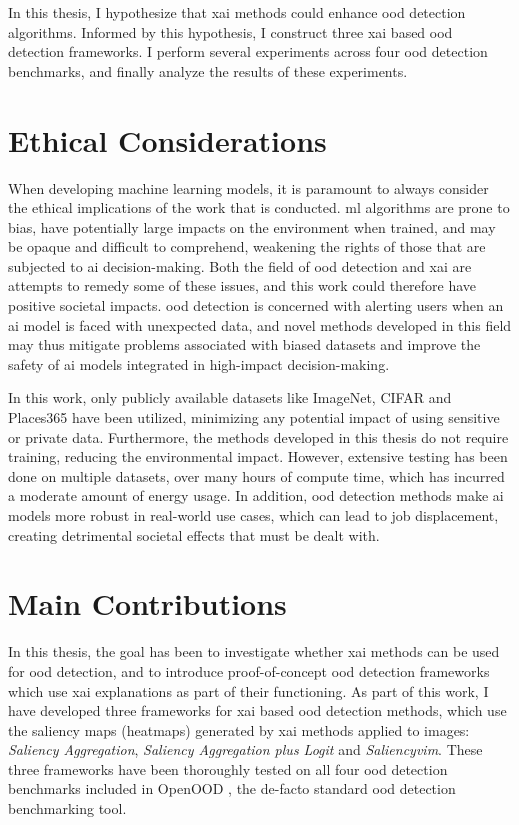 \documentclass[UKenglish]{uiomasterthesis} %
\theoremstyle{definition}
\begin{document}
In this thesis, I hypothesize that \ac{xai} methods could enhance \ac{ood} detection algorithms. Informed by this hypothesis, I construct three \ac{xai} based \ac{ood} detection frameworks. I perform several experiments across four \ac{ood} detection benchmarks, and finally analyze the results of these experiments.

\section{Ethical Considerations}

When developing machine learning models, it is paramount to always consider the ethical implications of the work that is conducted. \ac{ml} algorithms are prone to bias, have potentially large impacts on the environment when trained, and may be opaque and difficult to comprehend, weakening the rights of those that are subjected to \ac{ai} decision-making. Both the field of \ac{ood} detection and \ac{xai} are attempts to remedy some of these issues, and this work could therefore have positive societal impacts. \ac{ood} detection is concerned with alerting users when an \ac{ai} model is faced with unexpected data, and novel methods developed in this field may thus mitigate problems associated with biased datasets and improve the safety of \ac{ai} models integrated in high-impact decision-making. 

In this work, only publicly available datasets like ImageNet, CIFAR and Places365 have been utilized, minimizing any potential impact of using sensitive or private data. Furthermore, the methods developed in this thesis do not require training, reducing the environmental impact. However, extensive testing has been done on multiple datasets, over many hours of compute time, which has incurred a moderate amount of energy usage. In addition, \ac{ood} detection methods make \ac{ai} models more robust in real-world use cases, which can lead to job displacement, creating detrimental societal effects that must be dealt with.

\section{Main Contributions}

In this thesis, the goal has been to investigate whether \ac{xai} methods can be used for \ac{ood} detection, and to introduce proof-of-concept \ac{ood} detection frameworks which use \ac{xai} explanations as part of their functioning. As part of this work, I have developed three frameworks for \ac{xai} based \ac{ood} detection methods, which use the saliency maps (heatmaps) generated by \ac{xai} methods applied to images: {\it Saliency Aggregation}, {\it Saliency Aggregation plus Logit} and {\it Saliency\acs*{vim}}. These three frameworks have been thoroughly tested on all four \ac{ood} detection benchmarks included in OpenOOD \cite{openood, openood15}, the de-facto standard \ac{ood} detection benchmarking tool.
\end{document}
